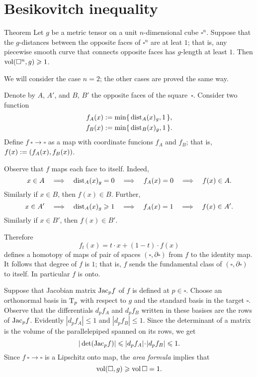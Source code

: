 \section{Besikovitch inequality}

\begin{thm}{Theorem}\label{thm:besikovitch}
Let $g$ be a metric tensor on a unit $n$-dimensional cube $\square^n$.
Suppose that the $g$-distances between the opposite faces of $\square^n$ are at leat $1$; that is, any piecewise smooth curve that connects opposite faces has $g$-length at least $1$.
Then $\operatorname{\rm vol}\nolimits(\square^n, g)\geqslant 1$.
\end{thm}

We will consider the case $n=2$; the other cases are proved the same way.

Denote by $A$, $A'$, and $B$, $B'$ the opposite faces of the square~$\square$.
Consider two function 
\begin{align*}
f_A(x)&\mathrel{:=}\min\{\,\mathrm{dist}_A(x)_g,1\,\},
\\
f_B(x)&\mathrel{:=}\min\{\,\mathrm{dist}_B(x)_g,1\,\}.
\end{align*}
Define $f\:\square\to\square$ as a map with coordinate funcions $f_A$ and $f_B$;
that is, $f(x)\mathrel{:=}(f_A(x), f_B(x))$.

Observe that $f$ maps each face to itself.
Indeed, 
\[x\in A \quad\Longrightarrow\quad \mathrm{dist}_A(x)_g=0 \quad\Longrightarrow\quad f_A(x)=0 \quad\Longrightarrow\quad f(x)\in A.\]
Similarly if $x\in B$, then $f(x)\in B$.
Further, 
\[x\in A'
\quad\Longrightarrow\quad 
\mathrm{dist}_A(x)_g\geqslant 1 
\quad\Longrightarrow\quad 
f_A(x)=1 
\quad\Longrightarrow\quad 
f(x)\in A'.\]
Similarly if $x\in B'$, then $f(x)\in B'$.

Therefore 
\[f_t(x)= t\cdot x + (1-t)\cdot f(x)\]
defines a homotopy of maps of pair of spaces $(\square,\partial \square)$ from $f$ to the identity map.
It follows that degree of $f$ is $1$; that is, $f$ sends the fundamental class of $(\square,\partial \square)$ to itself.
In particular $f$ is onto.

Suppose that Jacobian  matrix $\mathrm{Jac}_pf$ of $f$ is defined at $p\in \square$.
Choose an orthonormal basis in $\mathrm{T}_p$ with respect to $g$ and the standard basis in the target $\square$.
Observe that the differentials $d_pf_A$ and $d_pf_B$ written in these basises are the rows of $\mathrm{Jac}_pf$.
Evidently $|d_pf_A|\le 1$ and $|d_pf_B|\le 1$.
Since the determinant of a matrix is the volume of the parallelepiped spanned on its rows, we get 
\[|\det(\Jac_pf)|\le |d_pf_A|\cdot|d_pf_B|\le 1.\]
Since $f\:\square\to\square$ is a Lipschitz onto map, the \emph{area formula} implies that 
\[\operatorname{\rm vol}\nolimits(\square,g)\geqslant \operatorname{\rm vol}\nolimits\square=1.\]
\qedsf

